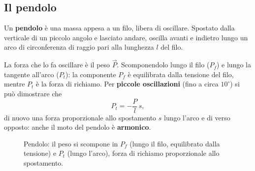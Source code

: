 \subsection{Il pendolo}
Un \textbf{pendolo} è una massa appesa a un filo, libera di oscillare. Spostato dalla verticale di un piccolo angolo e lasciato andare, oscilla avanti e indietro lungo un arco di circonferenza di raggio pari alla lunghezza $l$ del filo.

La forza che lo fa oscillare è il peso $\vec P$. Scomponendolo lungo il filo ($P_f$) e lungo la tangente all'arco ($P_t$): la componente $P_f$ è equilibrata dalla tensione del filo, mentre $P_t$ è la forza di richiamo. Per \textbf{piccole oscillazioni} (fino a circa $10^\circ$) si può dimostrare che
\[ P_t = -\frac{P}{l}\,s, \]
di nuovo una forza proporzionale allo spostamento $s$ lungo l'arco e di verso opposto: anche il moto del pendolo è \textbf{armonico}.

\begin{figure}[!htbp]
    \centering
    \caption{Pendolo: il peso si scompone in $P_f$ (lungo il filo, equilibrato dalla tensione) e $P_t$ (lungo l'arco), forza di richiamo proporzionale allo spostamento.}
    \label{fig:pendolo-dinamico}
\end{figure}

